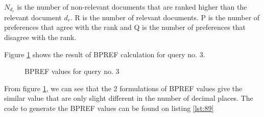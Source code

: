 \documentclass[letterpaper,11pt]{article}
\begin{document}
\(N_{d_r}\) is the number of non-relevant documents that are ranked higher than the relevant document \({d_r}\). R is the number of relevant documents. P is the number of preferences that agree with the rank and Q is the number of preferences that disagree with the rank. 

Figure \ref{fig:89_output} shows the result of BPREF calculation for query no. 3. 
\begin{figure}[H]
	\centering
	\caption{BPREF values for query no. 3}
	\label{fig:89_output}
\end{figure}

From figure \ref{fig:89_output}, we can see that the 2 formulations of BPREF values give the similar value that are only slight different in the number of decimal places.  The code to generate the BPREF values can be found on listing \ref{lst:89}
\end{document}
